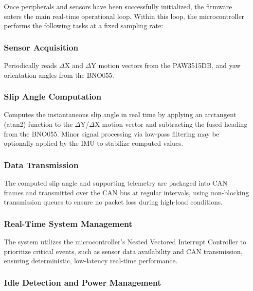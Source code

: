 \documentclass[12pt]{article}
\begin{document}
            Once peripherals and sensors have been successfully initialized, the firmware enters the main real-time operational loop. Within this loop, the microcontroller performs 
            the following tasks at a fixed sampling rate:

            \subsubsection{Sensor Acquisition}

                Periodically reads $\Delta$X and $\Delta$Y motion vectors from the PAW3515DB, and yaw orientation angles from the BNO055. 

            \subsubsection{Slip Angle Computation}

                Computes the instantaneous slip angle in real time by applying an arctangent (atan2) function to the $\Delta$Y/$\Delta$X motion vector and subtracting the 
                fused heading from the BNO055. Minor signal processing via low-pass filtering may be optionally applied by the IMU to stabilize computed values.

            \subsubsection{Data Transmission}

                The computed slip angle and supporting telemetry are packaged into CAN frames and transmitted over the CAN bus at regular intervals, using non-blocking 
                transmission queues to ensure no packet loss during high-load conditions.

            \subsubsection{Real-Time System Management}

                The system utilizes the microcontroller’s Nested Vectored Interrupt Controller to prioritize critical events, such as sensor data availability and CAN transmission, 
                ensuring deterministic, low-latency real-time performance.

            \subsubsection{Idle Detection and Power Management}
\end{document}
